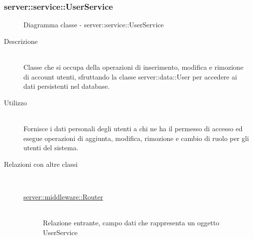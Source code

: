 \subsubsection[UserService]{server::service::UserService}
\begin{figure}[H]
	\centering
	\caption{Diagramma classe - server::service::UserService}
\end{figure}\begin{description}
\item[Descrizione] \hfill \\
Classe che si occupa della operazioni di inserimento, modifica e rimozione di account utenti, sfruttando la classe server::data::User per accedere ai dati persistenti nel database.
\item[Utilizzo] \hfill \\
Fornisce i dati personali degli utenti a chi ne ha il permesso di accesso ed esegue operazioni di aggiunta, modifica, rimozione e cambio di ruolo per gli utenti del sistema.
\item[Relazioni con altre classi] \hfill \\
\vspace{-7mm}
\begin{description}
	\item[\hyperlink{server::middleware::Router}{server::middleware::Router}] \hfill \\
	Relazione entrante, campo dati che rappresenta un oggetto UserService
\end{description}


\end{description}
